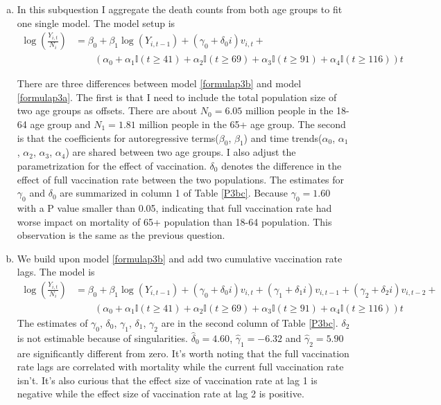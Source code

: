 \documentclass[12pt]{article}
\begin{document}
\begin{enumerate}[(a)]
\item 

In this subquestion I aggregate the death counts from both age groups to fit one single model. The model setup is
\begin{align}
	\log(\frac{Y_{i, t}}{N_{i}}) &= \beta_{0}+\beta_{1}\log(Y_{i, t-1})+ (\gamma_{0} + \delta_{0}i) v_{i, t} + \label{formulap3b} \\
	&\qquad \left(\alpha_{0} + \alpha_{1}\mathbb{I}(t \geq 41) + \alpha_{2}\mathbb{I}(t \geq 69) +\alpha_{3} \mathbb{I}(t \geq 91) + \alpha_{4}\mathbb{I}(t \geq 116)\right)t	\nonumber
\end{align}

There are three differences between model \ref{formulap3b} and model \ref{formulap3a}. The first is that I need to include the total population size of two age groups as offsets. There are about $N_{0}=6.05$ million people in the 18-64 age group and $N_{1}=1.81$ million people in the 65+ age group. The second is that the coefficients for autoregressive terms($\beta_{0}$, $\beta_{1}$) and time trends($\alpha_0$, $\alpha_1$, $\alpha_2$, $\alpha_3$, $\alpha_4$) are shared between two age groups. I also adjust the parametrization for the effect of vaccination. $\delta_0$ denotes the difference in the effect of full vaccination rate between the two populations. The estimates for $\gamma_0$ and $\delta_0$ are summarized in column 1 of Table \ref{P3bc}. Because $\gamma_0 = 1.60$ with a P value smaller than 0.05, indicating that full vaccination rate had worse impact on mortality of 65+ population than 18-64 population. This observation is the same as the previous question.


\item We build upon model \ref{formulap3b} and add two cumulative vaccination rate lags. The model is
\begin{align}
	\log(\frac{Y_{i, t}}{N_{i}}) &= \beta_{0}+\beta_{1}\log(Y_{i, t-1})+ (\gamma_{0} + \delta_{0}i) v_{i, t} + (\gamma_{1} + \delta_{1}i) v_{i, t-1} + (\gamma_{2} + \delta_{2}i) v_{i, t-2} + \label{formulap3c} \\
	&\qquad \left(\alpha_{0} + \alpha_{1}\mathbb{I}(t \geq 41) + \alpha_{2}\mathbb{I}(t \geq 69) +\alpha_{3} \mathbb{I}(t \geq 91) + \alpha_{4}\mathbb{I}(t \geq 116)\right)t	\nonumber
\end{align}
The estimates of $\gamma_0$, $\delta_0$, $\gamma_1$, $\delta_1$, $\gamma_2$ are in the second column of Table \ref{P3bc}. $\delta_2$ is not estimable because of singularities. $\hat{\delta}_0=4.60$, $\hat{\gamma}_1=-6.32$ and $\hat{\gamma}_2=5.90$ are significantly different from zero. It's worth noting that the full vaccination rate lags are correlated with mortality while the current full vaccination rate isn't. It's also curious that the  effect size of vaccination rate at lag 1 is negative while the effect size of vaccination rate at lag 2 is positive.


\end{enumerate}
\end{document}
